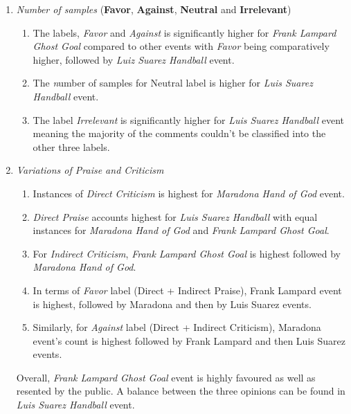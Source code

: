 \documentclass[sigconf, review]{acmart}
\begin{document}
\begin{enumerate}
    \item \textit{Number of samples} (\textbf{Favor}, \textbf{Against}, \textbf{Neutral} and \textbf{Irrelevant})
    \begin{enumerate}
    \item The labels, \textit{Favor} and \textit{Against} is significantly higher for  \textit{Frank Lampard Ghost Goal} compared to other events with \textit{Favor} being comparatively higher, followed by \textit{Luiz Suarez Handball} event.
    \item The \textit number of samples for {Neutral} label is higher for \textit{Luis Suarez Handball} event.
    \item The label \textit{Irrelevant} is significantly higher for \textit{Luis Suarez Handball} event meaning the majority of the comments couldn't be classified into the other three labels.
   
    \end{enumerate}
    \item \textit{Variations of Praise and Criticism}
    \begin{enumerate}
        \item Instances of \textit{Direct Criticism} is highest for \textit{Maradona Hand of God} event.
        \item \textit{Direct Praise} accounts highest for \textit{Luis Suarez Handball} with equal instances for \textit{Maradona Hand of God} and \textit{Frank Lampard Ghost Goal}.
        \item For \textit{Indirect Criticism}, \textit{Frank Lampard Ghost Goal} is highest followed by \textit{Maradona Hand of God}.
        \item In terms of \textit{Favor} label (Direct + Indirect Praise), Frank Lampard event is highest, followed by Maradona and then by Luis Suarez events.
        \item  Similarly, for \textit{Against} label (Direct + Indirect Criticism), Maradona event's count is highest followed by Frank Lampard and then Luis Suarez events.
    
    \end{enumerate}
    
     Overall, \textit{Frank Lampard Ghost Goal} event is highly favoured as well as resented by the public. A balance between the three opinions can be found in \textit{Luis Suarez Handball} event.


\end{enumerate}
\end{document}
